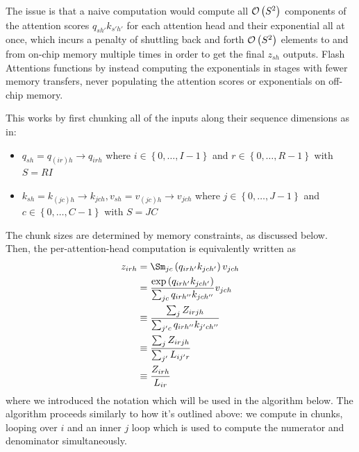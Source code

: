\documentclass[11pt]{article}
\begin{document}
The issue is that a naive computation would compute all $ \mathcal{O} \left( S ^{ 2 } \right)  $
components of the attention scores $ q _{ sh' } k _{ s'h' } $ for each attention head and their
exponential all at once, which incurs a penalty of shuttling back and forth $ \mathcal{O} \left( S ^{ 2 }
\right)  $ elements to and from on-chip memory multiple times in order to get the final $ z _{ sh }
$ outputs. Flash Attentions functions by instead computing the exponentials in stages with fewer
memory transfers, never populating the attention scores or exponentials on off-chip memory.

This works by first chunking all of the inputs along their sequence dimensions as in:
\begin{itemize}
    \item $  q _{ sh } =q _{ (ir)h }\longrightarrow  q _{ irh }  $ where $ i \in \left \{ 0, \ldots
        , I-1 \right \} $ and $ r \in \left \{ 0, \ldots , R-1 \right \} $ with $ S=RI $
    \item $ k _{ sh } = k _{ (jc)h } \longrightarrow  k _{jch} , v _{ sh } = v _{ (jc)h }
        \longrightarrow  v _{jch} $ where $ j \in \left \{ 0, \ldots , J-1 \right \} $ and $ c \in
        \left \{ 0, \ldots , C-1 \right \} $ with $ S=JC $
\end{itemize}
The chunk sizes are determined by memory constraints, as discussed below.  Then, the
per-attention-head computation is equivalently written as
\begin{align}
    z _{irh} &= \Sm _{jc} \left ( q _{ irh' } k _{ jch' } \right ) v _{ jch } \nn
             &= \frac{ \exp \left (  q _{ irh' } k _{ jch' } \right ) }{ \sum _{ jc } q _{ irh'' } k _{ jch'' } } v _{ jch }\nn
             &\equiv \frac{\sum _{ j } Z _{ irjh } }{   \sum _{ j'c } q _{ irh'' } k _{ j'ch'' } }\nn
             &\equiv \frac{\sum _{ j } Z _{ irjh } }{\sum _{ j' }L _{ ij'r }}\nn
             &\equiv \frac{ Z _{ irh } }{L _{ ir }}\nn
\end{align}
where we introduced the notation which will be used in the algorithm below. The algorithm proceeds
similarly to how it's outlined above: we compute in chunks, looping over $ i $ and an inner $ j$
loop which is used to compute the numerator and denominator simultaneously.
\end{document}

